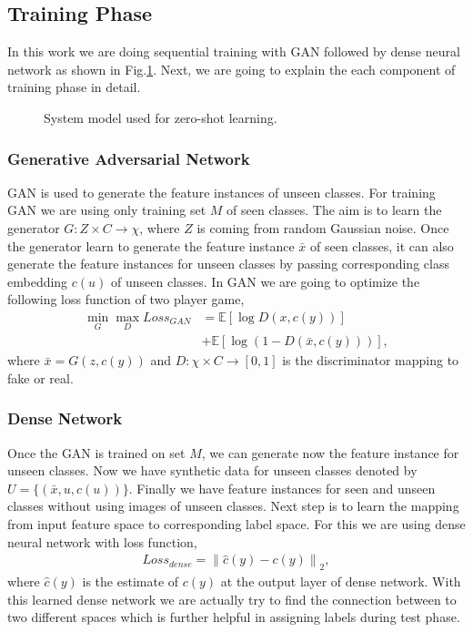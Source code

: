 \documentclass[11pt, conference, english]{IEEEtran}
\theoremstyle{plain}
\theoremstyle{definition}
\theoremstyle{remark}
\newcommand{\eq}[1]{\begin{align*}#1\end{align*}}
\newcommand{\norm}[1]{\left\lVert#1\right\rVert}
\newcommand{\E}{\mathbb{E}}
\begin{document}
	
	\subsection{Training Phase}
	In this work we are doing sequential training with GAN followed by dense neural network as shown in Fig.\ref{Fig:SystemModel}. Next, we are going to explain the each component of training phase in detail.
		\begin{figure}[h!]
			\centering
			\caption{System model used for zero-shot learning.}
			\label{Fig:SystemModel}
		\end{figure}
	\subsubsection{Generative Adversarial Network } GAN is used to generate the feature instances of unseen classes. For training GAN we are using only training set $M$ of seen classes. The aim is to learn the generator $G:Z \times C \rightarrow \chi$, where $Z$ is coming from random Gaussian noise. Once the generator learn to generate the feature instance $\bar{x}$ of seen classes, it can also generate the feature instances for unseen classes by passing corresponding class embedding $c(u)$ of unseen classes. In GAN we are going to optimize the following loss function of two player game,
	\eq{\min_G \max_D Loss_{GAN}&=\E [\log D(x,c(y))]\\
		&+\E[\log(1-D(\bar{x},c(y)))],}
	where $\bar{x}=G(z,c(y))$ and $D:\chi \times C \rightarrow [0,1]$ is the discriminator mapping to fake or real.
	\subsubsection{Dense Network}
	 Once the GAN is trained on set $M$, we can generate now the feature instance for unseen classes. Now we have synthetic data for unseen classes denoted by 
	$U=\{(\bar{x},u,c(u))\}$. Finally we have feature instances for seen and unseen classes without using images of unseen classes. Next step is to learn the mapping from input feature space to corresponding label space. For this we are using dense neural network with loss function,
	\eq{Loss_{dense}=\norm{\hat{c}(y)-c(y)}_2,} 
	where $\hat{c}(y)$ is the estimate of $c(y)$ at the output layer of dense network. With this learned dense network we are actually try to find the connection between to two different spaces which is further helpful in assigning labels during test phase.
	
\end{document}
